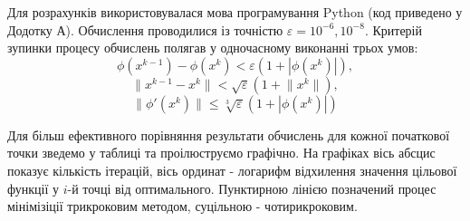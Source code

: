Для розрахунків використовувалася мова програмування Python (код приведено у Додотку А). Обчислення проводилися із точністю $\varepsilon = 10^{-6}, 10^{-8}$. Критерій зупинки процесу обчислень полягав у одночасному виконанні трьох умов:
$$
\phi(x^{k-1}) - \phi(x^{k}) < \varepsilon(1 + |\phi(x^{k})|), $$
$$\lVert x^{k-1} - x^{k} \rVert < \sqrt{\varepsilon}(1 + \lVert x^{k} \rVert), $$
$$ \lVert \phi'(x^{k})\rVert \leq \sqrt[3]{\varepsilon}(1 + |\phi(x^{k})|) 
$$

Для більш ефективного порівняння результати обчислень для кожної початкової точки зведемо у таблиці та проілюструємо графічно. На графіках вісь абсцис показує кількість ітерацій, вісь ординат - логарифм відхилення значення цільової функції у $i$-й точці від оптимального. Пунктирною лінією позначений процес мінімізіції трикроковим методом, суцільною - чотирикроковим.




